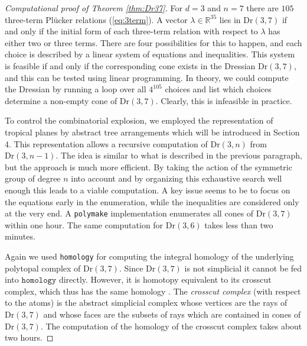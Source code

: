 \documentclass[12pt,a4paper]{amsart}
\theoremstyle{definition}
\newcommand{\R}{{\mathbb{R}}}
\newcommand{\Dr}{{\mathrm{Dr}}}
\providecommand\polymake{\texttt{polymake}\xspace}
\providecommand\homology{\texttt{homology}\xspace}
\begin{document}
\begin{proof}[Computational proof of Theorem \ref{thm:Dr37}]
  For $d=3$ and $n=7$ there are $105$ three-term Pl\"ucker relations
  (\ref{eq:3term}). A vector $\lambda \in \R^{35}$ lies in $\Dr(3,7)$
  if and only if the initial form of each three-term relation with
  respect to $\lambda$ has either two or three terms. There are four
  possibilities for this to happen, and each choice is described by a
  linear system of equations and inequalities.  This system is
  feasible if and only if the corresponding cone exists in the
  Dressian $\Dr(3,7)$, and this can be tested using linear
  programming.  In theory, we could compute the Dressian by running
  a loop over all $4^{105}$ choices and list which choices determine a
  non-empty cone of $\Dr(3,7)$.  Clearly, this is infeasible in
  practice.

  To control the combinatorial explosion, we employed the
  representation of tropical planes by abstract tree arrangements
  which will be introduced in Section 4. This representation allows a
  recursive computation of $\Dr(3,n)$ from $\Dr(3,n-1)$. The idea is
  similar to what is described in the previous paragraph, but the
  approach is much more efficient.  By taking the action of the
  symmetric group of degree $n$ into account and by organizing this
  exhaustive search well enough this leads to a viable computation.  A
  key issue seems to be to focus on the equations early in the
  enumeration, while the inequalities are considered only at the very
  end.  A \polymake implementation enumerates all cones of $\Dr(3,7)$
  within one hour.  The same computation for $\Dr(3,6)$ takes less
  than two minutes.

  Again we used \homology for computing the integral homology of the
  underlying polytopal complex of $\Dr(3,7)$.  Since $\Dr(3,7)$ is not
  simplicial it cannot be fed into $\homology$ directly.  However, it
  is homotopy equivalent to its crosscut complex, which thus has the
  same homology \cite{Bjor}.  The \emph{crosscut complex} (with
  respect to the atoms) is the abstract simplicial complex whose
  vertices are the rays of $\Dr(3,7)$ and whose faces are the subsets
  of rays which are contained in cones of $\Dr(3,7)$.  The computation
  of the homology of the crosscut complex takes about two hours.
\end{proof}
\end{document}

